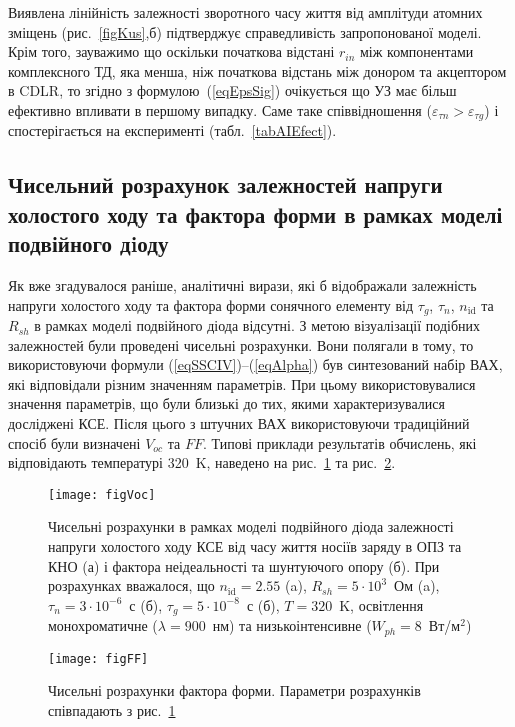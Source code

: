 Виявлена лінійність залежності зворотного часу життя від амплітуди атомних зміщень (рис.~\ref{figKus},б) підтверджує
справедливість запропонованої моделі.
Крім того, зауважимо що оскільки початкова відстані $r_{in}$ між компонентами комплексного ТД, яка  менша, ніж початкова відстань між донором та акцептором в CDLR,
то згідно з формулою~(\ref{eqEpsSig}) очікується що УЗ має більш ефективно впливати в першому випадку.
Саме таке співвідношення ($\varepsilon_{\tau n}>\varepsilon_{\tau g}$) і спостерігається на експерименті (табл.~\ref{tabAIEfect}).


\subsection{Чисельний розрахунок залежностей напруги холостого ходу та фактора форми в рамках моделі подвійного дiоду\label{sbVocSim}}


Як вже згадувалося раніше,
аналітичні вирази, які б відображали залежність напруги холостого ходу та фактора форми сонячного елементу
від $\tau_g$, $\tau_n$, $n_{\mathrm{id}}$ та $R_{sh}$ в рамках  моделі подвійного діода відсутні.
З метою візуалізації подібних залежностей були проведені чисельні розрахунки.
Вони полягали в тому, то використовуючи
формули (\ref{eqSSCIV})--(\ref{eqAlpha}) був синтезований набір ВАХ, які відповідали різним
значенням параметрів.
При цьому використовувалися значення параметрів, що були близькі до тих, якими характеризувалися досліджені КСЕ.
Після цього з штучних ВАХ використовуючи традиційний спосіб були визначені $V_{oc}$ та $F\!F$.
Типові приклади результатів обчислень, які відповідають температурі 320~K, наведено на рис.~\ref{figVoc} та рис.~\ref{figFF}.


\begin{figure}[b]
\center
\texttt{[image: figVoc]}
\caption{\label{figVoc}
Чисельні розрахунки
в рамках моделі подвійного діода залежності напруги холостого ходу КСЕ від часу життя носіїв заряду в ОПЗ та КНО (а) і
фактора неідеальності та шунтуючого опору (б).
При розрахунках вважалося, що $n_\mathrm{id}=2.55$ (a), $R_{sh}=5\cdot10^3$~Ом (a), $\tau_n=3\cdot10^{-6}$~с (б), $\tau_g=5\cdot10^{-8}$~с (б), $T=320$~K,
освітлення монохроматичне ($\lambda=900$~нм) та низькоінтенсивне ($W_{ph}=8$~Вт/м$^2$)
}%
\end{figure}


\begin{figure}
\center
\texttt{[image: figFF]}
\caption{\label{figFF}
Чисельні розрахунки фактора форми.
Параметри розрахунків співпадають з рис.~\ref{figVoc}
}%
\end{figure}

